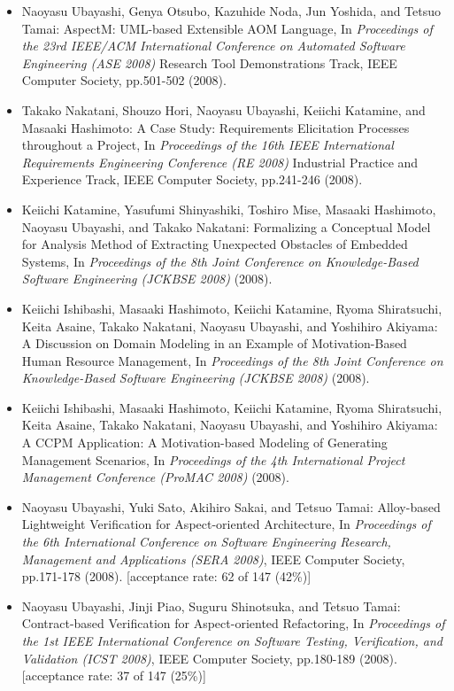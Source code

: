 \documentclass{jarticle}
\begin{document}
\begin{itemize}
\item Naoyasu Ubayashi, Genya Otsubo, Kazuhide Noda, Jun Yoshida, and Tetsuo Tamai:
AspectM: UML-based Extensible AOM Language,
In {\em Proceedings of the 23rd IEEE/ACM International Conference on Automated Software Engineering (ASE 2008)} Research Tool Demonstrations Track,
IEEE Computer Society,
pp.501-502 (2008).

\item Takako Nakatani, Shouzo Hori, Naoyasu Ubayashi, Keiichi Katamine, and Masaaki Hashimoto:
A Case Study: Requirements Elicitation Processes throughout a Project,
In {\em Proceedings of the 16th IEEE International Requirements Engineering Conference (RE 2008)} Industrial Practice and Experience Track,
IEEE Computer Society,
pp.241-246 (2008).

\item Keiichi Katamine, Yasufumi Shinyashiki, Toshiro Mise, Masaaki Hashimoto, Naoyasu Ubayashi, and Takako Nakatani:
Formalizing a Conceptual Model for Analysis Method of Extracting Unexpected Obstacles of Embedded Systems,
In {\em Proceedings of the 8th Joint Conference on Knowledge-Based Software Engineering (JCKBSE 2008)} (2008).

\item Keiichi Ishibashi, Masaaki Hashimoto, Keiichi Katamine, Ryoma Shiratsuchi, Keita Asaine, Takako Nakatani, Naoyasu Ubayashi, and Yoshihiro Akiyama:
A Discussion on Domain Modeling in an Example of Motivation-Based Human Resource Management,
In {\em Proceedings of the 8th Joint Conference on Knowledge-Based Software Engineering (JCKBSE 2008)} (2008).

\item Keiichi Ishibashi, Masaaki Hashimoto, Keiichi Katamine, Ryoma Shiratsuchi, Keita Asaine, Takako Nakatani, Naoyasu Ubayashi, and Yoshihiro Akiyama:
A CCPM Application: A Motivation-based Modeling of Generating Management Scenarios,
In {\em Proceedings of the 4th International Project Management Conference (ProMAC 2008)} (2008).

\item Naoyasu Ubayashi, Yuki Sato, Akihiro Sakai, and Tetsuo Tamai:
Alloy-based Lightweight Verification for Aspect-oriented Architecture,
In {\em Proceedings of the 6th International Conference on Software Engineering Research, Management and Applications (SERA 2008)},
IEEE Computer Society,
pp.171-178 (2008).
[acceptance rate: 62 of 147 (42\%)]

\item Naoyasu Ubayashi, Jinji Piao, Suguru Shinotsuka, and Tetsuo Tamai:
Contract-based Verification for Aspect-oriented Refactoring,
In {\em Proceedings of the 1st IEEE International Conference on Software Testing, Verification, and Validation (ICST 2008)},
IEEE Computer Society,
pp.180-189 (2008).
[acceptance rate: 37 of 147 (25\%)]


\end{itemize}
\end{document}
